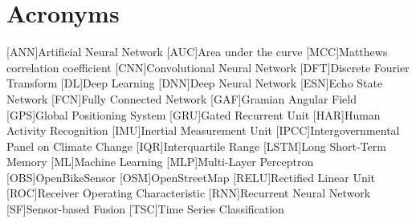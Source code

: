 
\cleardoublepage
{}
\section*{Acronyms}

\acresetall

\begin{acronym}[Bash]
	[ANN]{Artificial Neural Network}
	[AUC]{Area under the curve}
	[MCC]{Matthews correlation coefficient}
	[CNN]{Convolutional Neural Network}
	[DFT]{Discrete Fourier Transform}
	[DL]{Deep Learning}
	[DNN]{Deep Neural Network}
	[ESN]{Echo State Network}
	[FCN]{Fully Connected Network}
	[GAF]{Gramian Angular Field}
	[GPS]{Global Positioning System}
	[GRU]{Gated Recurrent Unit}
	[HAR]{Human Activity Recognition}
	[IMU]{Inertial Measurement Unit}
	[IPCC]{Intergovernmental Panel on Climate Change}
	[IQR]{Interquartile Range}
	[LSTM]{Long Short-Term Memory}	
	[ML]{Machine Learning}
	[MLP]{Multi-Layer Perceptron}
	[OBS]{OpenBikeSensor}
	[OSM]{OpenStreetMap}
	[RELU]{Rectified Linear Unit}
	[ROC]{Receiver Operating Characteristic}
	[RNN]{Recurrent Neural Network}
	[SF]{Sensor-based Fusion}
	[TSC]{Time Series Classification}
\end{acronym}

\acresetall